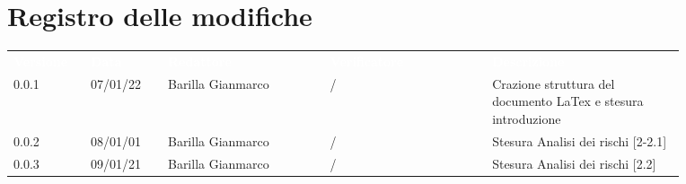 \section*{Registro delle modifiche}

{\renewcommand{\arraystretch}{1.5}
\begin{tabular}{p{0.10\linewidth}p{0.10\linewidth}p{0.21\linewidth}p{0.21\linewidth}p{0.25\linewidth}}
	\rowcolor[RGB]{33, 73, 50}
	\textcolor{white}{\textbf{Versione}} & \textcolor{white}{\textbf{Data}} & \textcolor{white}
	{\textbf{Redattore}} & \textcolor{white}{\textbf{Verificatore}} & \textcolor{white}
	{\textbf{Descrizione}}\\
	\rowcolor[RGB]{216, 235, 171}
	0.0.1 & 07/01/22 & Barilla Gianmarco & / & Crazione struttura del documento LaTex e stesura introduzione\\
	\rowcolor[RGB]{233, 245, 206}
	0.0.2 & 08/01/01 & Barilla Gianmarco & / & Stesura Analisi dei rischi [2-2.1]\\
	\rowcolor[RGB]{216, 235, 171}
	0.0.3 & 09/01/21 & Barilla Gianmarco& / & Stesura Analisi dei rischi [2.2]\\
	
\end{tabular}	
}